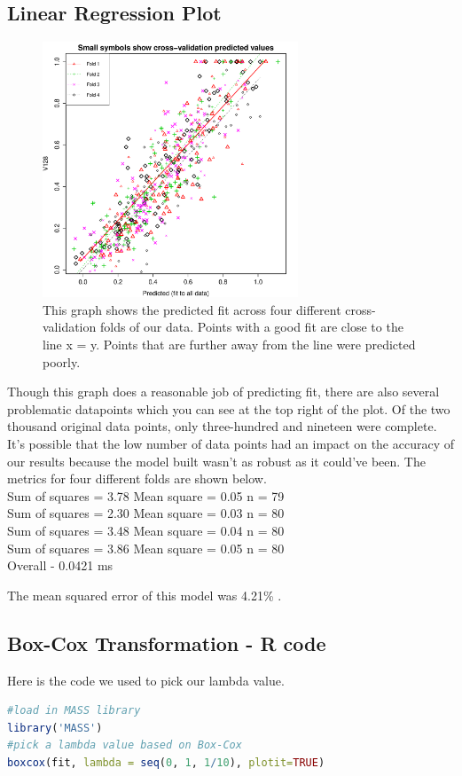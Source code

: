 \documentclass{article}
\begin{document}
\subsection{Linear Regression Plot}
\begin{figure}[H]
\centering
\includegraphics[width=3.0in]{part1a.pdf}
\caption{This graph shows the predicted fit across four different cross-validation folds of our data. Points with a good fit are close to the line x = y. Points that are further away from the line were predicted poorly.}\label{fig_container} 
\end{figure}

Though this graph does a reasonable job of predicting fit, there are also several problematic datapoints which you can see at the top right of the plot. Of the two thousand original data points, only three-hundred and nineteen were complete. It's possible that the low number of data points had an impact on the accuracy of our results because the model built wasn't as robust as it could've been. The metrics for four different folds are shown below.\\ 

Sum of squares = 3.78    Mean square = 0.05    n = 79\\ 
Sum of squares = 2.30    Mean square = 0.03    n = 80\\
Sum of squares = 3.48    Mean square = 0.04    n = 80\\ 
Sum of squares = 3.86    Mean square = 0.05    n = 80\\ 

Overall - 0.0421 ms

The mean squared error of this model was 4.21\% . 


\subsection{Box-Cox Transformation - R code}
Here is the code we used to pick our lambda value.
\begin{lstlisting}[language=r]
#load in MASS library
library('MASS')
#pick a lambda value based on Box-Cox
boxcox(fit, lambda = seq(0, 1, 1/10), plotit=TRUE)
\end{lstlisting}
\end{document}

